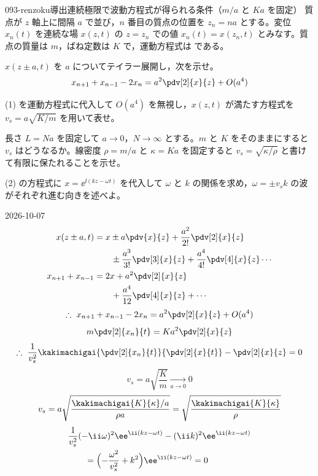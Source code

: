 \documentclass[uplatex,dvipdfmx,a4paper,11pt]{jsarticle}
\begin{document}
\begin{mondai}{093-renzoku}{導出}{連続極限で波動方程式が得られる条件（$m/a$ と $Ka$ を固定）}
質点が $z$ 軸上に間隔 $a$ で並び，$n$ 番目の質点の位置を $z_n=na$ とする。変位 $x_n(t)$ を連続な場 $x(z,t)$ の $z=z_n$ での値 $x_n(t)=x(z_n,t)$ とみなす。質点の質量は $m$，ばね定数は $K$ で，運動方程式は  である。
  \begin{shoumon}
    \item $x(z\pm a,t)$ を $a$ についてテイラー展開し，次を示せ。
      \[ x_{n+1}+x_{n-1}-2x_n=a^{2}\pdv[2]{x}{z}+O(a^{4}) \]
    \item (1) を運動方程式に代入して $O(a^{4})$ を無視し，$x(z,t)$ が満たす方程式を $v_s=a\sqrt{K/m}$ を用いて表せ。
    \item 長さ $L=Na$ を固定して $a\to0$，$N\to\infty$ とする。$m$ と $K$ をそのままにすると $v_s$ はどうなるか。線密度 $\rho=m/a$ と $\kappa=Ka$ を固定すると $v_s=\sqrt{\kappa/\rho}$ と書けて有限に保たれることを示せ。
    \item (2) の方程式に $x=\ee^{\ii(kz-\omega t)}$ を代入して $\omega$ と $k$ の関係を求め，$\omega=\pm v_sk$ の波がそれぞれ進む向きを述べよ。
  \end{shoumon}
\begin{kotaeutsushi}{2026-10-07}
\begin{align*}
  x(z\pm a,t)&=x\pm a\pdv{x}{z}+\frac{a^{2}}{2!}\pdv[2]{x}{z}\\
  &\qquad\pm\frac{a^{3}}{3!}\pdv[3]{x}{z}+\frac{a^{4}}{4!}\pdv[4]{x}{z}\cdots\\
  x_{n+1}+x_{n-1}&=2x+a^{2}\pdv[2]{x}{z}\\
  &\qquad+\frac{a^{4}}{12}\pdv[4]{x}{z}+\cdots
\end{align*}
\[ \therefore\ x_{n+1}+x_{n-1}-2x_n=a^{2}\pdv[2]{x}{z}+O(a^{4}) \]
\[ m\pdv[2]{x_n}{t}=Ka^{2}\pdv[2]{x}{z} \]
\[ \therefore\ \frac{1}{v_s^{2}}\kakimachigai{\pdv[2]{x_n}{t}}{\pdv[2]{x}{t}}-\pdv[2]{x}{z}=0 \]
\[ v_s=a\sqrt{\frac{K}{m}}\xrightarrow[a\to0]{}0 \]
\[ v_s=a\sqrt{\frac{\kakimachigai{K}{\kappa}/a}{\rho a}}=\sqrt{\frac{\kakimachigai{K}{\kappa}}{\rho}} \]
\begin{align*}
  &\frac{1}{v_s^{2}}(-\ii\omega)^{2}\ee^{\ii(kz-\omega t)}-(\ii k)^{2}\ee^{\ii(kz-\omega t)}\\
  &\qquad=\Bigl(-\frac{\omega^{2}}{v_s^{2}}+k^{2}\Bigr)\ee^{\ii(kz-\omega t)}=0

\end{align*}
\end{kotaeutsushi}
\end{mondai}
\end{document}
